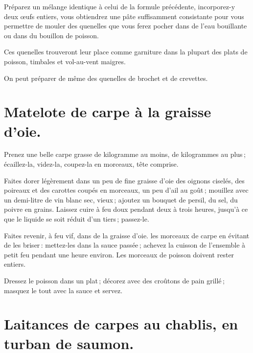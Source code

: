 Préparez un mélange identique à celui de la formule précédente, incorporez-y
deux œufs entiers, vous obtiendrez une pâte suffisamment consistante pour vous
permettre de mouler des quenelles que vous ferez pocher dans de l’eau
bouillante ou dans du bouillon de poisson.

Ces quenelles trouveront leur place comme garniture dans la plupart des plats
de poisson, timbales et vol-au-vent maigres.

\sk

On peut préparer de même des quenelles de brochet et de crevettes.

\section*{\centering Matelote de carpe à la graisse d'oie.}

Prenez une belle carpe grasse de {\mmm} kilogramme au moins, de
{\mmm} kilogrammes au plus ; écaillez-la, videz-la, coupez-la en morceaux,
tête comprise.

Faites dorer légèrement dans un peu de fine graisse d'oie des oignons ciselés,
des poireaux et des carottes coupés en morceaux, un peu d'ail au goût ;
mouillez avec un demi-litre de vin blanc sec, vieux ; ajoutez un bouquet de
persil, du sel, du poivre en grains. Laissez cuire à feu doux pendant deux
à trois heures, jusqu'à ce que le liquide se soit réduit d'un tiers ;
passez-le.

Faites revenir, à feu vif, dans de la graisse d'oie. les morceaux de carpe en
évitant de les briser : mettez-les dans la sauce passée ; achevez la cuisson de
l'ensemble à petit feu pendant une heure environ. Les morceaux de poisson
doivent rester entiers.

Dressez le poisson dans un plat ; décorez avec des croûtons de pain grillé ;
masquez le tout avec la sauce et servez.

\section*{\centering Laitances de carpes au chablis, en turban de saumon.}

